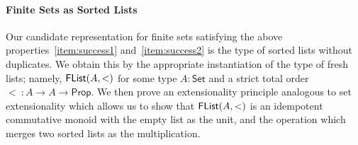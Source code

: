\documentclass[a4paper]{easychair}
\newtheorem{theorem}{Theorem}
\newtheorem{definition}{Definition}
\newcommand{\AgdaFontStyle}[1]{\textsf{#1}}
\newcommand{\AgdaBoundFontStyle}[1]{\textit{#1}}
\newcommand{\AgdaFormat}[2]{#2}
\newcommand{\AgdaNoSpaceMath}[1]
    {\begingroup\thickmuskip=0mu\medmuskip=0mu#1\endgroup}
\newcommand{\AgdaBound}[1]
    {\AgdaNoSpaceMath{\textcolor{AgdaBound}{\AgdaBoundFontStyle{\AgdaFormat{#1}{#1}}}}}
\newcommand{\AgdaDatatype}[1]
    {\AgdaNoSpaceMath{\textcolor{AgdaDatatype}{\AgdaFontStyle{\AgdaFormat{#1}{{#1}}}}}}
\newcommand{\AgdaInductiveConstructor}[1]
    {\AgdaNoSpaceMath{\textcolor{AgdaInductiveConstructor}{\AgdaFontStyle{\AgdaFormat{#1}{{#1}}}}}}
\newcommand\bv[1]{{\AgdaBound{$#1$}}}
\newcommand\ty[1]{\AgdaDatatype{$#1$}}
\newcommand{\flistsymb}{\AgdaDatatype{FList}}
\newcommand{\flist}[2]{\ensuremath{\flistsymb(#1,#2)}}
\newcommand{\freshfor}{\AgdaDatatype{\#}}
\newcommand\nil{\AgdaInductiveConstructor{nil}}
\newcommand\cons{\AgdaInductiveConstructor{cons}}
\newcommand\nilF{\AgdaInductiveConstructor{nil$_{\#}$}}
\newcommand\consF{\AgdaInductiveConstructor{cons$_{\#}$}}
\newcommand\univ{\mathsf{Type}} %
\newcommand\setuniv{\mathsf{Set}} %
\newcommand\propuniv{\mathsf{Prop}} %
\begin{document}


\paragraph{Finite Sets as Sorted Lists}
Our candidate representation for finite sets satisfying the above properties~\eqref{item:success1} and~\eqref{item:success2} is the type of sorted lists without duplicates.
We obtain this by the appropriate instantiation of the type of fresh lists;
namely, \flist{A}{<} for some type $A : \setuniv$ and a strict total order $< \  : A \to A \to \propuniv$.
We then prove an extensionality principle analogous to set extensionality which allows us to show that \flist{A}{<} is an idempotent commutative monoid
with the empty list as the unit,
and the operation which merges two sorted lists as the multiplication.

\end{document}
